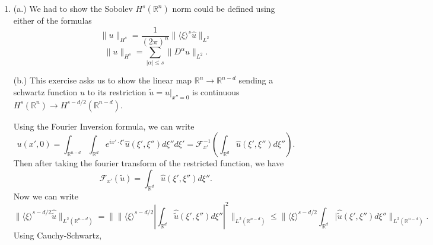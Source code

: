 \documentclass[11pt, reqno]{article}
\theoremstyle{plain}
\theoremstyle{definition}
\theoremstyle{remark}
\newcommand{\RR}{\mathbb{R}}
\begin{document}
\begin{enumerate}

    \item[1.] (a.) We had to show the Sobolev $H^s(\RR^n)$ norm could be defined using either of the formulas 
    \[
        \|u\|_{H^s} = \frac{1}{{(2\pi)}^n}\|\langle \xi\rangle^s \hat{u}\|_{L^2}
    \]
    \[
        \|u\|_{H^s} = \sum_{|\alpha| \leq s} \|D^\alpha u\|_{L^2}.
    \]

    (b.) This exercise asks us to show the linear map $\RR^n \to \RR^{n-d}$ sending a
    schwartz function $u$ to its restriction $\tilde{u} = u|_{x'' = 0}$ is continuous
    $H^s(\RR^n) \to H^{s-d/2}(\RR^{n-d})$.
    
    Using the Fourier Inversion formula, we can write
    \[
        u(x', 0) = \int_{\RR^{n-d}}\int_{\RR^d} e^{ix'\cdot \xi'} \hat{u}(\xi', \xi'')d\xi''d\xi' = 
        \mathcal{F}_{x'}^{-1}\left(\int_{\RR^d}\hat{u}(\xi',\xi'')d\xi''\right).
    \]
    Then after taking the fourier transform of the restricted function, we have
    \[
        \mathcal{F}_{x'}\left(\tilde{u}\right) = \int_{\RR^d}\hat{u}(\xi',\xi'')d\xi''.
    \]
    Now we can write
    \[
        \|\langle \xi\rangle^{s-d/2}\hat{\tilde{u}}\|_{L^2(\RR^{n-d})}
        = \|\|\langle \xi\rangle^{s-d/2}{\left|\int_{\RR^d}\hat{\tilde{u}}(\xi',\xi'')d\xi''\right|}^2\|_{L^2(\RR^{n-d})}
        \leq \|\langle \xi\rangle^{s-d/2}\int_{\RR^d}|\hat{\tilde{u}}(\xi',\xi'')d\xi''\|_{L^2(\RR^{n-d})}.
    \]
    Using Cauchy-Schwartz, 
    

\end{enumerate}
\end{document}
